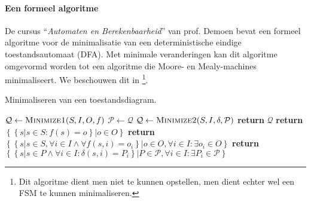 \begin{table}[hbt]
\centering
{}
\caption{Geminimaliseerde toestandstabellen van de leidende voorbeelden.}
\end{table}

\paragraph{Een formeel algoritme}
De cursus ``\emph{Automaten en Berekenbaarheid}'' van prof. Demoen\cite{aenb10} bevat een formeel algoritme voor de minimalisatie van een deterministische eindige toestandsautomaat (DFA). Met minimale veranderingen kan dit algoritme omgevormd worden tot een algoritme die Moore- en Mealy-machines minimaliseert. We beschouwen dit in \footnote{Dit algoritme dient men niet te kunnen opstellen, men dient echter wel een FSM te kunnen minimaliseren.}.

\begin{algorithm}[hbt]
\caption{Minimaliseren van een toestandsdiagram.}\label{alg:minimizeFSM}
\begin{algorithmic}[1]
\State $\mathcal{Q}\gets\Call{Minimize1}{S,I,O,f}$
\Repeat
\State $\mathcal{P}\gets\mathcal{Q}$
\State $\mathcal{Q}\gets\Call{Minimize2}{S,I,\delta,\mathcal{P}}$
\State \textbf{return} $\mathcal{Q}$
\EndProcedure
{}
\State \textbf{return} $\left\{\left\{s|s\in S:f\left(s\right)=o\right\}|o\in O\right\}$
\EndFunction
{}
\State \textbf{return} $\left\{\left\{s|s\in S,\forall i\in I\wedge\forall f\left(s,i\right)=o_i\right\}|o\in O,\forall i\in I:\exists o_i\in O\right\}$
\EndFunction
{}
\State \textbf{return} $\left\{\left\{s|s\in P\wedge \forall i \in I:\delta\left(s,i\right)=P_i\right\}|P\in\mathcal{P},\forall i\in I:\exists P_i\in\mathcal{P}\right\}$
\EndFunction
\end{algorithmic}
\end{algorithm}

